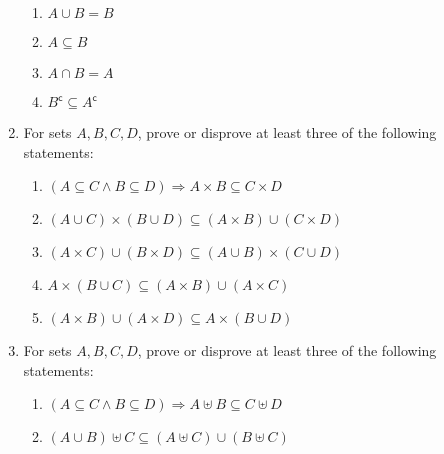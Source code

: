 \documentclass[10pt,\jkfside,a4paper]{article}
\begin{document}
\begin{enumerate}
\begin{enumerate}
\item $A \cup B = B$

\item $A \subseteq B$

\item $A \cap B = A$

\item $B^\mathsf{c} \subseteq A^\mathsf{c}$




\end{enumerate}

\item For sets $A, B, C, D$, prove or disprove at least three of the following statements:

\begin{enumerate}

\item $(A \subseteq C \wedge B \subseteq D) \Longrightarrow A \times B \subseteq C \times D$



\item $(A \cup C) \times (B \cup D) \subseteq (A \times B) \cup (C \times D)$



\item $(A \times C) \cup (B \times D) \subseteq (A \cup B) \times (C \cup D)$



\item $A \times (B \cup C) \subseteq (A \times B) \cup (A \times C)$



\item $(A \times B) \cup (A \times D) \subseteq A \times (B \cup D)$



\end{enumerate}

\item For sets $A, B, C, D$, prove or disprove at least three of the following statements:

\begin{enumerate}

\item $(A \subseteq C \wedge B \subseteq D) \Longrightarrow A \uplus B \subseteq C \uplus D$



\item $(A \cup B) \uplus C \subseteq (A \uplus C) \cup (B \uplus C)$




\end{enumerate}
\end{enumerate}
\end{document}
